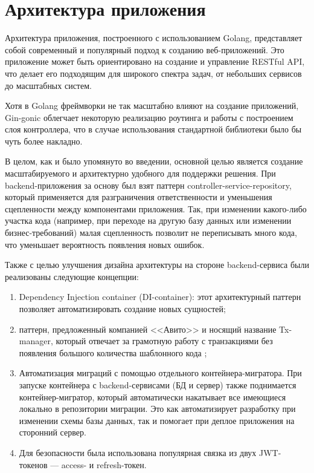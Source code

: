 \documentclass[diploma]{SCWorks}
\begin{document}
\section{Архитектура приложения}

Архитектура приложения, построенного с использованием Golang, представляет
собой современный и популярный подход к созданию веб-приложений. Это приложение 
может быть ориентировано на создание и управление RESTful API, что делает его 
подходящим для широкого спектра задач, от небольших сервисов до масштабных 
систем.

Хотя в Golang фреймворки не так масштабно влияют на создание приложений, 
Gin-gonic облегчает некоторую реализацию роутинга и работы с построением слоя
контроллера, что в случае использования стандартной библиотеки было бы чуть 
более накладно.

В целом, как и было упомянуто во введении, основной целью является создание 
масштабируемого и архитектурно удобного для поддержки решения. При 
backend-приложения за основу был взят паттерн controller-service-repository,
который применяется для разграничения ответственности и уменьшения сцепленности
между компонентами приложения. Так, при изменении какого-либо участка кода 
(например, при переходе на другую базу данных или изменении бизнес-требований) 
малая сцепленность позволит не переписывать много кода, что уменьшает 
вероятность появления новых ошибок.

Также с целью улучшения дизайна архитектуры на стороне backend-сервиса были 
реализованы следующие концепции:
\begin{enumerate}
    \item Dependency Injection container (DI-container): этот архитектурный 
    паттерн позволяет автоматизировать создание новых сущностей;
    \item паттерн, предложенный компанией <<Авито>> и носящий название 
    Tx-manager, который отвечает за грамотную работу с транзакциями без 
    появления большого количества шаблонного кода \cite{txmanager};
    \item Автоматизация миграций с помощью отдельного контейнера-мигратора.
    При запуске контейнера с backend-сервисами (БД и сервер) также поднимается
    контейнер-мигратор, который автоматически накатывает все имеющиеся локально
    в репозитории миграции. Это как автоматизирует разработку при изменении 
    схемы базы данных, так и помогает при деплое приложения на сторонний сервер.
    \item Для безопасности была использована популярная связка из двух 
    JWT-токенов — access- и refresh-токен.
\end{enumerate}
\end{document}

